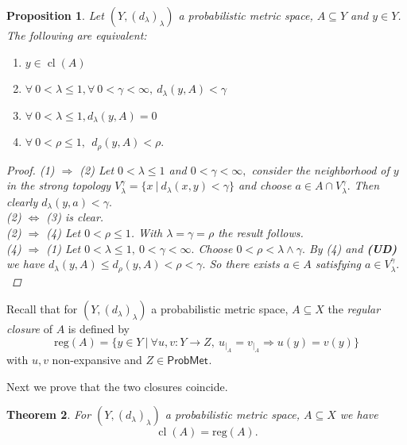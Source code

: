 \documentclass[12pt,a4paper]{amsart}
\theoremstyle{theorem}
\newtheorem{theorem}{Theorem}[section]
\newtheorem{proposition}[theorem]{Proposition}
\theoremstyle{definition}
\newcommand{\PM}{\ensuremath{\mathsf{ProbMet_{}}}}
\DeclareMathOperator{\cl}{cl}
\renewcommand{\l}{\ensuremath{\lambda}}
\def\rw{\rightarrow}
\begin{document}
{\begin{proposition}\label{equivtop}
Let $(Y, (d_\l)_\l)$ a probabilistic metric space, $A \subseteq Y$ and $y \in Y$.
The following are equivalent:
\begin{enumerate}
\item $y \in \cl(A)$
\item $\forall\  0< \l \leq 1, \forall  \ 0 < \gamma < \infty, \ d_\l(y,A) < \gamma$
\item $\forall\  0< \l \leq 1, d_\l(y,A) =0$
\item $\forall \ 0< \rho \leq 1, \  \ d_\rho(y,A) < \rho.$
\end{enumerate}
\begin{proof}
(1) $\Rightarrow$ (2) Let $0< \l \leq 1$ and $0< \gamma < \infty,$ consider the neighborhood of $y$ in the strong topology 
$V_\l^\gamma = \{ x \ | \ d_\l(x,y) < \gamma \}$ and choose $a \in A \cap V_\l^\gamma.$ Then clearly $d_\l(y,a) < \gamma.$\\
(2) $\Leftrightarrow$ (3) is clear.\\
(2) $\Rightarrow$ (4) Let $ 0< \rho \leq 1$. With $\l = \gamma = \rho$ the result follows.\\
(4) $\Rightarrow$ (1) Let  $0< \l \leq 1,  \ 0 < \gamma < \infty.$ Choose $0 < \rho < \l \wedge \gamma.$ By (4) and {\bf(UD)} we have $d_\l (y ,A) \leq d_\rho(y,A) < \rho <\gamma.$ So there exists $a \in A$ satisfying $a \in V_\l^\gamma.$

\end{proof}
\end{proposition}

Recall that for $(Y, (d_\l)_\l)$ a probabilistic metric space, $A \subseteq X$ the \emph{regular closure} of $A$ is defined by
$$
\text{reg}(A) = \{ y \in Y \ | \ \forall  u,v : Y \rw Z, \  u_{|_A} = v_{|_A} \Rightarrow u(y) = v(y) \}
$$
with $u,v$ non-expansive and $ Z \in \PM.$

Next we prove that the two closures coincide.

\begin{theorem}\label{iso}
For $(Y, (d_\l)_\l)$ a probabilistic metric space, $A \subseteq X$ we have 
$$
\cl(A) = \text{reg}(A).
$$ 



\end{theorem}}
\end{document}
